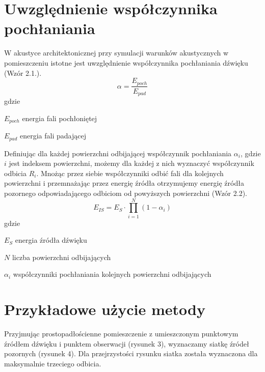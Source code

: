 
\section{Uwzględnienie współczynnika pochłaniania}\label{sec:zm}

W akustyce architektonicznej przy symulacji warunków akustycznych w pomieszczeniu istotne jest uwzględnienie współczynnika pochłaniania dźwięku (Wzór 2.1.). \\

\begin{equation}
\alpha=\frac{E_{poch}}{E_{pad}}
\end{equation}
gdzie
\begin{eqwhere}[2cm]
        \item[$E_{poch}$] energia fali pochłoniętej
        \item[$E_{pad}$] energia fali padającej
\end{eqwhere}

Definiując dla każdej powierzchni odbijającej współczynnik pochłaniania $\alpha_i$, gdzie $i$  jest indeksem powierzchni, możemy dla każdej z nich wyznaczyć współczynnik odbicia $R_i$. Mnożąc przez siebie współczynniki odbić fali dla kolejnych powierzchni i przemnażając przez energię źródła otrzymujemy energię źródła pozornego odpowiadającego odbiciom od powyższych powierzchni (Wzór 2.2). \\

\begin{equation}
E_{IS}=E_{S}\cdot\prod_{i=1}^{N}(1-\alpha_i)
\end{equation}
gdzie
\begin{eqwhere}[2cm]
        \item[$E_{S}$] energia źródła dźwięku
        \item[$N$] liczba powierzchni odbijających
        \item[$\alpha_i$] współczynniki pochłaniania kolejnych powierzchni odbijających
\end{eqwhere}


\section{Przykładowe użycie metody}\label{sec:przyuzy}

Przyjmując prostopadłościenne pomieszczenie z umieszczonym punktowym źródłem dźwięku i punktem obserwacji (rysunek 3), wyznaczamy siatkę źródeł pozornych (rysunek 4). Dla przejrzystości rysunku siatka została wyznaczona dla maksymalnie trzeciego odbicia.
 
